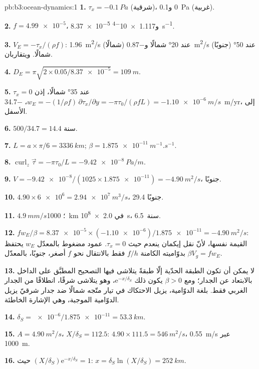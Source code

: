 \begin{solution}{pb:b3:ocean-dynamics:1}
\textbf{1.} $\tau_x = \qty{-0.1}{Pa}$ (شرقية)، 0 و\qty{+0.1}{Pa}
(غربية).

\textbf{2.} $f = \num{4.99e-5}$، \num{8.37e-5}
و\qty{1.117e-4}{s^{-1}}.

\textbf{3.} $V_E = -\tau_x/(\rho f)$: \qty{+1.96}{m^2/s} (شمالًا) عند
\ang{20} شمالًا و\qty{-0.87}{m^2/s} (جنوبًا) عند \ang{50} شمالًا. ويتقاربان.

\textbf{4.} $D_E = \pi\sqrt{2\times0.05/\num{8.37e-5}} = \qty{109}{m}$.

\textbf{5.} $\tau_x = 0$ عند \ang{35} شمالًا، إذن $w_E = -(1/\rho f)\,
\partial\tau_x/\partial y = -\pi\tau_0/(\rho fL) = \qty{-1.10e-6}{m/s}$،
\qty{-34.7}{m/yr}، إلى الأسفل.

\textbf{6.} $500/34.7 = \num{14.4}\text{ سنة}$.

\textbf{7.} $L = a\times\pi/6 = \qty{3336}{km}$; $\beta =
\qty{1.875e-11}{m^{-1}.s^{-1}}$.

\textbf{8.} $\operatorname{curl}_z\vec\tau = -\pi\tau_0/L =
\qty{-9.42e-8}{Pa/m}$.

\textbf{9.} $V = \num{-9.42e-8}/(1025\times\num{1.875e-11}) =
\qty{-4.90}{m^2/s}$، جنوبًا.

\textbf{10.} $4.90\times\num{6e6} = \qty{2.94e7}{m^3/s}$،
\qty{29.4}{\sverdrup} جنوبًا.

\textbf{11.} $\qty{4.9}{mm/s}$؛ \qty{1000}{km} في \qty{2.0e8}{s}،
\num{6.5}~سنة.

\textbf{12.} $fw_E/\beta = \num{8.37e-5}\times(\num{-1.10e-6})/
\num{1.875e-11} = \qty{-4.90}{m^2/s}$: القيمة نفسها، لأنّ نقل إيكمان
ينعدم حيث $\tau_x = 0$. عمود مضغوط بالمعدّل $w_E$
يحتفظ بدوّاميته الكامنة $f/h$ فقط بالانتقال نحو $f$ أصغر، جنوبًا،
بالمعدّل $\beta V_g = fw_E$.

\textbf{13.} لا يمكن أن تكون الطبقة الحدّية إلّا طبقةً يتلاشى فيها التصحيح المطبَّق على
الداخل بالابتعاد عن الجدار؛ ومع $\beta > 0$ يكون ذلك
$\mathrm e^{-x/\delta_S}$، وهو يتلاشى شرقًا، انطلاقًا من الجدار الغربي
فقط. بلغة الدوّامية، يزيل الاحتكاك في تيار متّجه شمالًا ضد جدار
شرقيّ يزيل الدوّامية الموجبة، وهي الإشارة الخاطئة.

\textbf{14.} $\delta_S = \num{e-6}/\num{1.875e-11} = \qty{53.3}{km}$.

\textbf{15.} $A = \qty{4.90}{m^2/s}$، $X/\delta_S = 112.5$:
$4.90\times111.5 = \qty{546}{m^2/s}$، \qty{0.55}{m/s} عبر
\qty{1000}{m}.

\textbf{16.} حيث $(X/\delta_S)\mathrm e^{-x/\delta_S} = 1$: $x =
\delta_S\ln(X/\delta_S) = \qty{252}{km}$.


\end{solution}
